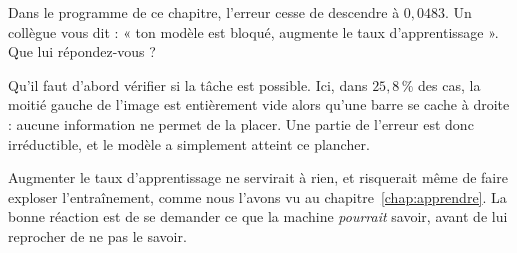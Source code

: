 \begin{exercice}
Dans le programme de ce chapitre, l'erreur cesse de descendre à $0{,}0483$.
Un collègue vous dit : « ton modèle est bloqué, augmente le taux
d'apprentissage ». Que lui répondez-vous ?
\end{exercice}

\begin{solution}
Qu'il faut d'abord vérifier si la tâche est possible. Ici, dans $25{,}8\,\%$
des cas, la moitié gauche de l'image est entièrement vide alors qu'une barre
se cache à droite : aucune information ne permet de la placer. Une partie de
l'erreur est donc irréductible, et le modèle a simplement atteint ce plancher.

Augmenter le taux d'apprentissage ne servirait à rien, et risquerait même de
faire exploser l'entraînement, comme nous l'avons vu au
chapitre~\ref{chap:apprendre}. La bonne réaction est de se demander ce que la
machine \emph{pourrait} savoir, avant de lui reprocher de ne pas le savoir.
\end{solution}
